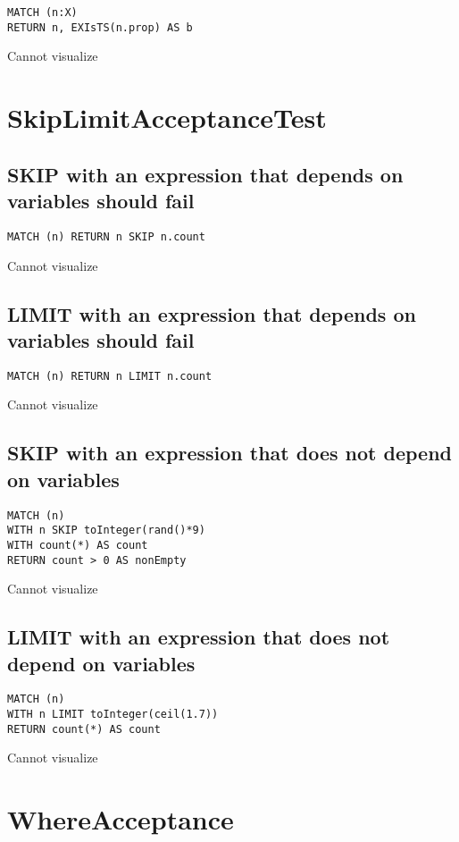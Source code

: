 \begin{lstlisting}
MATCH (n:X)
RETURN n, EXIsTS(n.prop) AS b
\end{lstlisting}

Cannot visualize
\section{SkipLimitAcceptanceTest}

\subsection{SKIP with an expression that depends on variables should fail}

\begin{lstlisting}
MATCH (n) RETURN n SKIP n.count
\end{lstlisting}

Cannot visualize
\subsection{LIMIT with an expression that depends on variables should fail}

\begin{lstlisting}
MATCH (n) RETURN n LIMIT n.count
\end{lstlisting}

Cannot visualize
\subsection{SKIP with an expression that does not depend on variables}

\begin{lstlisting}
MATCH (n)
WITH n SKIP toInteger(rand()*9)
WITH count(*) AS count
RETURN count > 0 AS nonEmpty
\end{lstlisting}

Cannot visualize
\subsection{LIMIT with an expression that does not depend on variables}

\begin{lstlisting}
MATCH (n)
WITH n LIMIT toInteger(ceil(1.7))
RETURN count(*) AS count
\end{lstlisting}

Cannot visualize
\section{WhereAcceptance}

